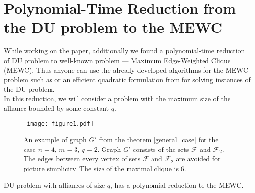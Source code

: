 \documentclass[smallextended]{svjour3}       %
\begin{document}
\section{Polynomial-Time Reduction from the DU problem to the MEWC}
While working on the paper, additionally we found a polynomial-time reduction of DU problem to well-known problem --- Maximum Edge-Weighted Clique (MEWC). Thus anyone can use the already developed algorithms for the MEWC problem such as \cite{san2019new} or an efficient quadratic formulation from \cite{hosseinian2017maximum} for solving instances of the DU problem.\\
In this reduction, we will consider a problem with the maximum size of the alliance bounded by some constant $q$.

\begin{figure}[h!]
\begin{center}
\texttt{[image: figure1.pdf]}
\caption{An example of graph $G'$ from the theorem \ref{general_case}  for the case $n=4$, $m=3$, $q=2$.  Graph $G'$ consists of the sets $\mathcal{F}$ and $\mathcal{F}_2$. The edges between every vertex of sets $\mathcal{F}$ and $\mathcal{F}_2$ are avoided for picture simplicity. The size of the maximal clique is 6. }
\label{fig:reduction}
\end{center}
\end{figure}

\begin{theorem}
\label{general_case}
    DU problem with alliances of size $q$, has a polynomial reduction to the MEWC.
\end{theorem}
\end{document}

